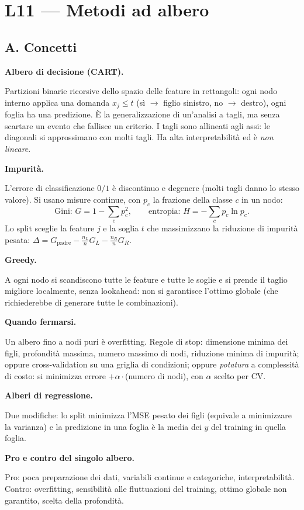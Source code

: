 \documentclass[11pt,a4paper]{article}
\newcommand{\dom}[1]{\par\smallskip\noindent\textbf{#1}\par\nopagebreak}
\begin{document}
\clearpage
\section{L11 --- Metodi ad albero}
\subsection*{A. Concetti}

\dom{Albero di decisione (CART).} Partizioni binarie ricorsive dello spazio delle feature in rettangoli: ogni nodo interno applica una domanda $x_j\le t$ (s\`i $\to$ figlio sinistro, no $\to$ destro), ogni foglia ha una predizione. \`E la generalizzazione di un'analisi a tagli, ma senza scartare un evento che fallisce un criterio. I tagli sono allineati agli assi: le diagonali si approssimano con molti tagli. Ha alta interpretabilit\`a ed \`e \emph{non lineare}.

\dom{Impurit\`a.} L'errore di classificazione $0/1$ \`e discontinuo e degenere (molti tagli danno lo stesso valore). Si usano misure continue, con $p_c$ la frazione della classe $c$ in un nodo:
\[
\text{Gini: }G=1-\sum_c p_c^2,\qquad \text{entropia: }H=-\sum_c p_c\ln p_c .
\]
Lo split sceglie la feature $j$ e la soglia $t$ che massimizzano la riduzione di impurit\`a pesata:
$\Delta=G_{\mathrm{padre}}-\frac{n_L}{n}G_L-\frac{n_R}{n}G_R$.

\dom{Greedy.} A ogni nodo si scandiscono tutte le feature e tutte le soglie e si prende il taglio migliore localmente, senza lookahead: non si garantisce l'ottimo globale (che richiederebbe di generare tutte le combinazioni).

\dom{Quando fermarsi.} Un albero fino a nodi puri \`e overfitting. Regole di stop: dimensione minima dei figli, profondit\`a massima, numero massimo di nodi, riduzione minima di impurit\`a; oppure cross-validation su una griglia di condizioni; oppure \emph{potatura} a complessit\`a di costo: si minimizza errore $+\alpha\cdot$(numero di nodi), con $\alpha$ scelto per CV.

\dom{Alberi di regressione.} Due modifiche: lo split minimizza l'MSE pesato dei figli (equivale a minimizzare la varianza) e la predizione in una foglia \`e la media dei $y$ del training in quella foglia.

\dom{Pro e contro del singolo albero.} Pro: poca preparazione dei dati, variabili continue e categoriche, interpretabilit\`a. Contro: overfitting, sensibilit\`a alle fluttuazioni del training, ottimo globale non garantito, scelta della profondit\`a.
\end{document}
